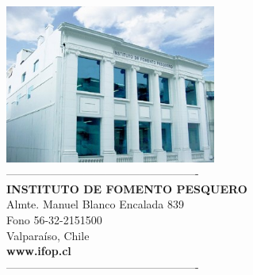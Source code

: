 \documentclass[12pt, oneside]{article} %
\begin{document}
\begin{titlepage}


\normalsize
\vspace*{12cm} 

\noindent

 \begin{minipage}{\textwidth}
  \parbox[t]{1.2\linewidth}{
 \begin{flushright}
            \centering
\includegraphics[height=5.2cm]{Figuras/Portada1_Final.jpg} \\
 ----------------------------------------------------\\
 \fontsize{11pt}{10pt}\selectfont 	
 \textbf{INSTITUTO DE FOMENTO PESQUERO} \\
 Almte. Manuel Blanco Encalada 839 \\ 
 Fono 56-32-2151500 \\
 Valparaíso, Chile \\
\textbf{www.ifop.cl} \\
 ----------------------------------------------------\\
\end{flushright} 
}
 \end{minipage}


\vfill
\end{titlepage}

\end{document}
